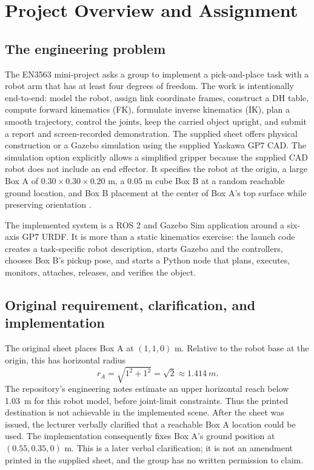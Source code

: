 \chapter{Project Overview and Assignment}
\label{ch:overview}

\section{The engineering problem}
The EN3563 mini-project asks a group to implement a pick-and-place task with a
robot arm that has at least four degrees of freedom. The work is intentionally
end-to-end: model the robot, assign link coordinate frames, construct a DH
table, compute forward kinematics (FK), formulate inverse kinematics (IK),
plan a smooth trajectory, control the joints, keep the carried object upright,
and submit a report and screen-recorded demonstration. The supplied sheet
offers physical construction or a Gazebo simulation using the supplied
Yaskawa GP7 CAD. The simulation option explicitly allows a simplified gripper
because the supplied CAD robot does not include an end effector. It specifies
the robot at the origin, a large Box A of $0.30\times0.30\times0.20$ m, a
$0.05$ m cube Box B at a random reachable ground location, and Box B placement
at the center of Box A's top surface while preserving orientation
\cite{assignment}.

The implemented system is a ROS 2 and Gazebo Sim application around a six-axis
GP7 URDF. It is more than a static kinematics exercise: the launch code creates
a task-specific robot description, starts Gazebo and the controllers, chooses
Box B's pickup pose, and starts a Python node that plans, executes, monitors,
attaches, releases, and verifies the object.

\section{Original requirement, clarification, and implementation}
The original sheet places Box A at $(1,1,0)$ m. Relative to the robot base at
the origin, this has horizontal radius
\begin{equation}
  r_A=\sqrt{1^2+1^2}=\sqrt{2}\approx\SI{1.414}{m}.
  \label{eq:box-a-radius}
\end{equation}
The repository's engineering notes estimate an upper horizontal reach below
\SI{1.03}{m} for this robot model, before joint-limit constraints. Thus the
printed destination is not achievable in the implemented scene. After the
sheet was issued, the lecturer verbally clarified that a reachable Box A
location could be used. The implementation consequently fixes Box A's ground
position at $(0.55,0.35,0)$ m. This is a later verbal clarification; it is not
an amendment printed in the supplied sheet, and the group has no written
permission to claim.

